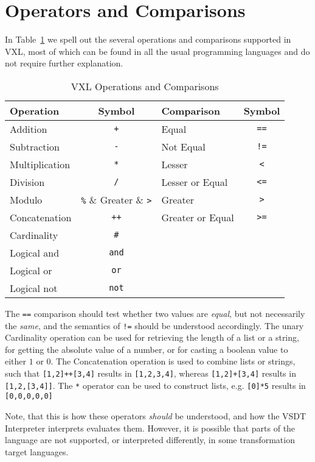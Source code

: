 
\section{Operators and Comparisons}

In Table~\ref{tab:vxl_op} we spell out the several operations and comparisons
supported in VXL, most of which can be found in all the usual programming languages
and do not require further explanation.

\begin{table}[htbp]
\centering
	\caption{VXL Operations and Comparisons}
	\begin{tabular}{lc||lc}
		\bf Operation   & \bf Symbol & \bf Comparison   & \bf Symbol \\
		\hline
		Addition        & \verb_+_	 & Equal            & \verb_==_  \\
		Subtraction     & \verb_-_	 & Not Equal        & \verb_!=_  \\
		Multiplication  & \verb_*_   & Lesser           & \verb_<_   \\
		Division        & \verb_/_   & Lesser or Equal  & \verb_<=_  \\
		Modulo          & \verb_%_   & Greater          & \verb_>_   \\
		Concatenation   & \verb_++_  & Greater or Equal & \verb_>=_  \\
		Cardinality     & \verb_#_   &                  &            \\
		Logical \sc and & \verb_and_ &                  &            \\
		Logical \sc or  & \verb_or_  &                  &            \\
		Logical \sc not & \verb_not_ &                  &            \\
	\end{tabular}
	\label{tab:vxl_op}
\end{table}

The \verb_==_ comparison should test whether two values are \emph{equal}, but not
necessarily the \emph{same}, and the semantics of \verb_!=_ should be understood
accordingly.  The unary Cardinality operation can be used for retrieving the length
of a list or a string, for getting the absolute value of a number, or for casting
a boolean value to either $1$ or $0$.  The Concatenation operation is used to
combine lists or strings, such that \verb_[1,2]++[3,4]_ results in \verb_[1,2,3,4]_,
whereas \verb_[1,2]+[3,4]_ results in \verb_[1,2,[3,4]]_.  The \verb_*_ operator
can be used to construct lists, e.g. \verb_[0]*5_ results in \verb_[0,0,0,0,0]_

Note, that this is how these operators \emph{should} be understood, and how the
VSDT Interpreter interprets evaluates them.  However, it is possible that parts
of the language are not supported, or interpreted differently, in some transformation
target languages.

